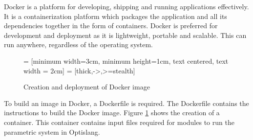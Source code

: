 Docker\cite{docker} is a platform for developing, shipping and running applications effectively. It is a containerization platform which packages the application and all 
its dependencies together in the form of containers. Docker is preferred for development and deployment as it is lightweight, portable and scalable. This can 
run anywhere, regardless of the operating system. 
\begin{figure}[!ht]
  \centering
   = [minimum width=3cm, minimum height=1cm, text centered, text width = 2cm]
   = [thick,->,>=stealth]
  \caption{Creation and deployment of Docker image}
  \label{docker_image_creation}
\end{figure}

To build an image in Docker, a Dockerfile is required. The Dockerfile contains the instructions to build the Docker image. Figure \ref{docker_image_creation} 
shows the creation of a container. This container contains input files required for modules to run the parametric system in Optislang. 

